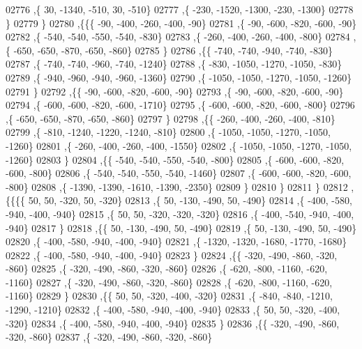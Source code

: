 \begin{DoxyCode}
02776     ,\{    30, -1340,  -510,    30,  -510\}
02777     ,\{  -230, -1520, -1300,  -230, -1300\}
02778     \}
02779    \}
02780   ,\{\{\{   -90,  -400,  -260,  -400,   -90\}
02781     ,\{   -90,  -600,  -820,  -600,   -90\}
02782     ,\{  -540,  -540,  -550,  -540,  -830\}
02783     ,\{  -260,  -400,  -260,  -400,  -800\}
02784     ,\{  -650,  -650,  -870,  -650,  -860\}
02785     \}
02786    ,\{\{  -740,  -740,  -940,  -740,  -830\}
02787     ,\{  -740,  -740,  -960,  -740, -1240\}
02788     ,\{  -830, -1050, -1270, -1050,  -830\}
02789     ,\{  -940,  -960,  -940,  -960, -1360\}
02790     ,\{ -1050, -1050, -1270, -1050, -1260\}
02791     \}
02792    ,\{\{   -90,  -600,  -820,  -600,   -90\}
02793     ,\{   -90,  -600,  -820,  -600,   -90\}
02794     ,\{  -600,  -600,  -820,  -600, -1710\}
02795     ,\{  -600,  -600,  -820,  -600,  -800\}
02796     ,\{  -650,  -650,  -870,  -650,  -860\}
02797     \}
02798    ,\{\{  -260,  -400,  -260,  -400,  -810\}
02799     ,\{  -810, -1240, -1220, -1240,  -810\}
02800     ,\{ -1050, -1050, -1270, -1050, -1260\}
02801     ,\{  -260,  -400,  -260,  -400, -1550\}
02802     ,\{ -1050, -1050, -1270, -1050, -1260\}
02803     \}
02804    ,\{\{  -540,  -540,  -550,  -540,  -800\}
02805     ,\{  -600,  -600,  -820,  -600,  -800\}
02806     ,\{  -540,  -540,  -550,  -540, -1460\}
02807     ,\{  -600,  -600,  -820,  -600,  -800\}
02808     ,\{ -1390, -1390, -1610, -1390, -2350\}
02809     \}
02810    \}
02811   \}
02812  ,\{\{\{\{    50,    50,  -320,    50,  -320\}
02813     ,\{    50,  -130,  -490,    50,  -490\}
02814     ,\{  -400,  -580,  -940,  -400,  -940\}
02815     ,\{    50,    50,  -320,  -320,  -320\}
02816     ,\{  -400,  -540,  -940,  -400,  -940\}
02817     \}
02818    ,\{\{    50,  -130,  -490,    50,  -490\}
02819     ,\{    50,  -130,  -490,    50,  -490\}
02820     ,\{  -400,  -580,  -940,  -400,  -940\}
02821     ,\{ -1320, -1320, -1680, -1770, -1680\}
02822     ,\{  -400,  -580,  -940,  -400,  -940\}
02823     \}
02824    ,\{\{  -320,  -490,  -860,  -320,  -860\}
02825     ,\{  -320,  -490,  -860,  -320,  -860\}
02826     ,\{  -620,  -800, -1160,  -620, -1160\}
02827     ,\{  -320,  -490,  -860,  -320,  -860\}
02828     ,\{  -620,  -800, -1160,  -620, -1160\}
02829     \}
02830    ,\{\{    50,    50,  -320,  -400,  -320\}
02831     ,\{  -840,  -840, -1210, -1290, -1210\}
02832     ,\{  -400,  -580,  -940,  -400,  -940\}
02833     ,\{    50,    50,  -320,  -400,  -320\}
02834     ,\{  -400,  -580,  -940,  -400,  -940\}
02835     \}
02836    ,\{\{  -320,  -490,  -860,  -320,  -860\}
02837     ,\{  -320,  -490,  -860,  -320,  -860\}

\end{DoxyCode}
